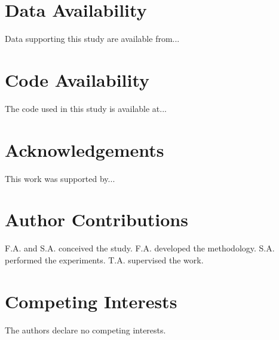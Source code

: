 \documentclass[11pt,a4paper]{article}
\begin{document}
\maketitle







\section*{Data Availability}
Data supporting this study are available from... 

\section*{Code Availability}
The code used in this study is available at...

\section*{Acknowledgements}
This work was supported by...

\section*{Author Contributions}
F.A. and S.A. conceived the study. F.A. developed the methodology.
S.A. performed the experiments. T.A. supervised the work.

\section*{Competing Interests}
The authors declare no competing interests.



\end{document}
